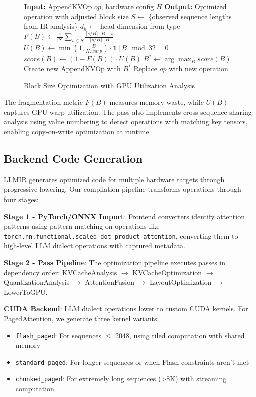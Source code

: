 \documentclass[conference]{IEEEtran}
\begin{document}
\begin{figure}[htbp]
\small
\begin{algorithmic}[1]
\STATE \textbf{Input:} AppendKVOp $op$, hardware config $H$
\STATE \textbf{Output:} Optimized operation with adjusted block size
\STATE $S \gets$ \{observed sequence lengths from IR analysis\}
\STATE $d_h \gets$ head dimension from type
    \STATE $F(B) \gets \frac{1}{|S|}\sum_{s \in S} \frac{\lceil s/B \rceil \cdot B - s}{\lceil s/B \rceil \cdot B}$
    \STATE $U(B) \gets \min(1, \frac{B}{H.warp}) \cdot \mathbf{1}[B \mod 32 = 0]$
    \STATE $score(B) \gets (1 - F(B)) \cdot U(B)$
\ENDFOR
\STATE $B^* \gets \arg\max_B score(B)$
    \STATE Create new AppendKVOp with $B^*$
    \STATE Replace $op$ with new operation
\ENDIF
\end{algorithmic}
\caption{Block Size Optimization with GPU Utilization Analysis}
\label{alg:block_opt}
\end{figure}

The fragmentation metric $F(B)$ measures memory waste, while $U(B)$ captures GPU warp utilization. The pass also implements cross-sequence sharing analysis using value numbering to detect operations with matching key tensors, enabling copy-on-write optimization at runtime.

\subsection{Backend Code Generation}

LLMIR generates optimized code for multiple hardware targets through progressive lowering. Our compilation pipeline transforms operations through four stages:

\textbf{Stage 1 - PyTorch/ONNX Import}: Frontend converters identify attention patterns using pattern matching on operations like \texttt{torch.nn.functional.scaled\_dot\_product\_attention}, converting them to high-level LLM dialect operations with captured metadata.

\textbf{Stage 2 - Pass Pipeline}: The optimization pipeline executes passes in dependency order: KVCacheAnalysis $\rightarrow$ KVCacheOptimization $\rightarrow$ QuantizationAnalysis $\rightarrow$ AttentionFusion $\rightarrow$ LayoutOptimization $\rightarrow$ LowerToGPU.

\textbf{CUDA Backend}: LLM dialect operations lower to custom CUDA kernels. For PagedAttention, we generate three kernel variants:
\begin{itemize}
    \item \texttt{flash\_paged}: For sequences $\leq$ 2048, using tiled computation with shared memory
    \item \texttt{standard\_paged}: For longer sequences or when Flash constraints aren't met
    \item \texttt{chunked\_paged}: For extremely long sequences (>8K) with streaming computation
\end{itemize}
\end{document}
